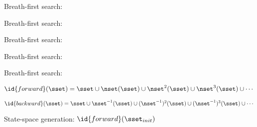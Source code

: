 
Breath-first search:



Breath-first search:



Breath-first search:



Breath-first search:



Breath-first search:


$\id{forward}(\sset)=\sset \cup \nset(\sset) \cup \nset^{2}(\sset)
\cup \nset^{3}(\sset) \cup \cdots$

$\id{backward}(\sset)=\sset
\cup \nset^{-1}(\sset) \cup (\nset^{-1})^{2}(\sset) \cup
(\nset^{-1})^{3}(\sset) \cup \cdots$

State-space generation: $\id{forward}(\sset_{init})$
